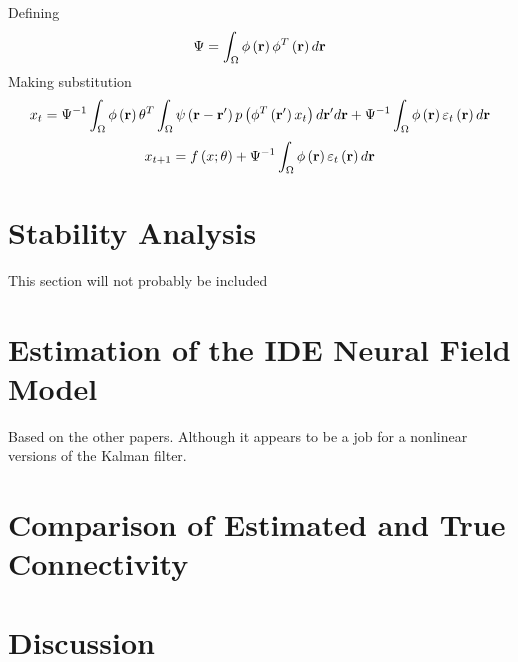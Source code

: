 \documentclass[onecolumn,draftcls]{IEEEtran}
\begin{document}
Defining
\begin{equation}\label{DefPsi}
\Psi  = \int_\Omega  {\phi \left( {\bf{r}} \right){\phi ^T}\left( {\bf{r}} \right)d{\bf{r}}}
\end{equation}
Making substitution
\begin{equation}\label{SS Model}
{x_t} = {\Psi ^{ - 1}}\int_\Omega  {\phi \left( {\bf{r}} \right){\theta ^T}\int_\Omega  {\psi \left( {{\bf{r}} - {\bf{r'}}} \right)p\left( {{\phi ^T}\left( {{\bf{r'}}} \right){x_t}} \right)d{\bf{r'}}} d{\bf{r}}}  + {\Psi ^{ - 1}}\int_\Omega  {\phi \left( {\bf{r}} \right){\varepsilon _t}\left( {\bf{r}} \right)d{\bf{r}}}
\end{equation}
\begin{equation}\label{AbbrevSSModel}
{x_{t + 1}} = f\left( {x;\theta } \right) + {\Psi ^{ - 1}}\int_\Omega  {\phi \left( {\bf{r}} \right){\varepsilon _t}\left( {\bf{r}} \right)d{\bf{r}}}
\end{equation}

\section{Stability Analysis}
This section will not probably be included

\section{Estimation of the IDE Neural Field Model}
Based on the other papers. Although it appears to be a job for a nonlinear versions of the Kalman filter.

\section{Comparison of Estimated and True Connectivity}

\section{Discussion}

%
%
\end{document}

